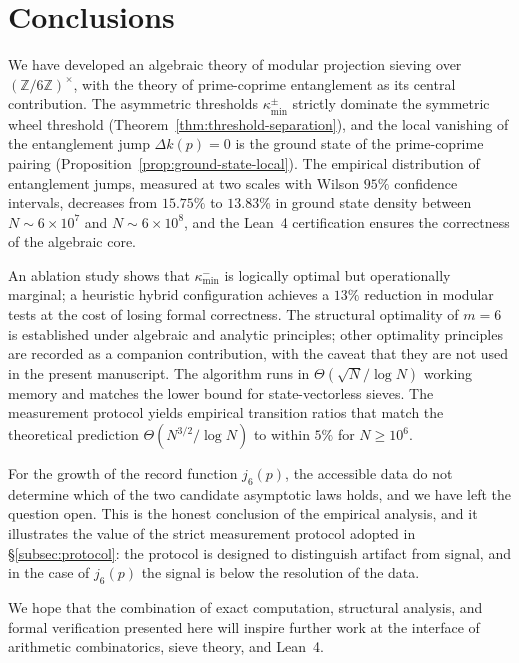 \documentclass[11pt]{amsart}
\numberwithin{equation}{section}
\newcommand{\ZZ}{\mathbb{Z}}
\newcommand{\kmin}{\kappa_{\min}}
\newcommand{\kminm}{\kappa_{\min}^{-}}
\theoremstyle{plain}
\theoremstyle{definition}
\begin{document}
\section{Conclusions}
\label{sec:conclusions}

We have developed an algebraic theory of modular projection sieving
over $(\ZZ/6\ZZ)^\times$, with the theory of prime-coprime
entanglement as its central contribution. The asymmetric thresholds
$\kmin^\pm$ strictly dominate the symmetric wheel threshold
(Theorem~\ref{thm:threshold-separation}), and the local vanishing of
the entanglement jump $\Delta k(p)=0$ is the ground state of the
prime-coprime pairing (Proposition~\ref{prop:ground-state-local}).
The empirical distribution of entanglement jumps, measured at two
scales with Wilson $95\%$ confidence intervals, decreases from
$15.75\%$ to $13.83\%$ in ground state density between
$N\sim 6\times 10^7$ and $N\sim 6\times 10^8$, and the Lean~4
certification ensures the correctness of the algebraic core.

An ablation study shows that $\kminm$ is logically optimal but
operationally marginal; a heuristic hybrid configuration achieves a
$13\%$ reduction in modular tests at the cost of losing formal
correctness. The structural optimality of $m=6$ is established under
algebraic and analytic principles; other optimality principles are
recorded as a companion contribution, with the caveat that they are
not used in the present manuscript. The algorithm runs in
$\Theta(\sqrt{N}/\log N)$ working memory and matches the lower bound
for state-vectorless sieves. The measurement protocol yields
empirical transition ratios that match the theoretical prediction
$\Theta(N^{3/2}/\log N)$ to within $5\%$ for $N\ge 10^6$.

For the growth of the record function $j_6(p)$, the accessible data
do not determine which of the two candidate asymptotic laws holds,
and we have left the question open. This is the honest conclusion of
the empirical analysis, and it illustrates the value of the strict
measurement protocol adopted in \S\ref{subsec:protocol}: the protocol
is designed to distinguish artifact from signal, and in the case of
$j_6(p)$ the signal is below the resolution of the data.

We hope that the combination of exact computation, structural
analysis, and formal verification presented here will inspire further
work at the interface of arithmetic combinatorics, sieve theory, and
Lean~4.
\end{document}
